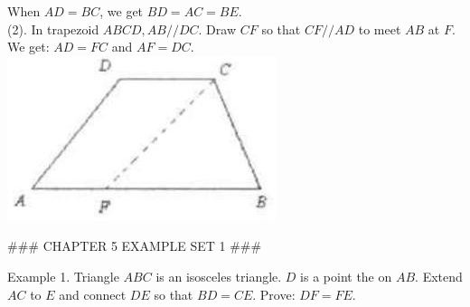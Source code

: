 \documentclass[10pt]{article}
\begin{document}
When \(A D=B C\), we get \(B D=A C=B E\).\\
(2). In trapezoid \(A B C D, A B / / D C\). Draw \(C F\) so that \(C F / / A D\) to meet \(A B\) at \(F\). We get: \(A D=F C\) and \(A F=D C\).\\
\includegraphics[max width=\textwidth, center]{2025_04_17_97bc1f7e44d93c271a88g-101(2)}


### CHAPTER 5 EXAMPLE SET 1 ###

Example 1. Triangle \(A B C\) is an isosceles triangle. \(D\) is a point the on \(A B\). Extend \(A C\) to \(E\) and connect \(D E\) so that \(B D=C E\). Prove: \(D F=F E\).
\end{document}
